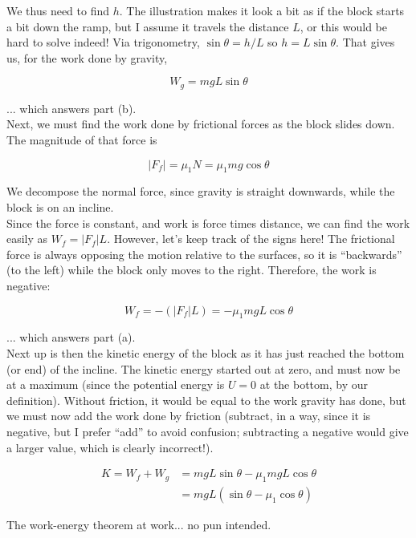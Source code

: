 \documentclass[12pt,a4paper]{report}
\begin{document}
We thus need to find $h$. The illustration makes it look a bit as if the block starts a bit down the ramp, but I assume it travels the distance $L$, or this would be hard to solve indeed! Via trigonometry, $\sin \theta = h/L$ so $h = L \sin \theta$. That gives us, for the work done by gravity,

\begin{equation}
W_g = m g L \sin \theta
\end{equation}

... which answers part (b).\\
Next, we must find the work done by frictional forces as the block slides down. The magnitude of that force is

\begin{equation}
|F_f| = \mu_1 N = \mu_1 m g \cos \theta
\end{equation}

We decompose the normal force, since gravity is straight downwards, while the block is on an incline.\\
Since the force is constant, and work is force times distance, we can find the work easily as $W_f = |F_f| L$. However, let's keep track of the signs here! The frictional force is always opposing the motion relative to the surfaces, so it is ``backwards'' (to the left) while the block only moves to the right. Therefore, the work is negative:

\begin{equation}
W_f = -(|F_f| L) = - \mu_1 m g L \cos \theta
\end{equation}

... which answers part (a).\\
Next up is then the kinetic energy of the block as it has just reached the bottom (or end) of the incline. The kinetic energy started out at zero, and must now be at a maximum (since the potential energy is $U = 0$ at the bottom, by our definition). Without friction, it would be equal to the work gravity has done, but we must now add the work done by friction (subtract, in a way, since it is negative, but I prefer ``add'' to avoid confusion; subtracting a negative would give a larger value, which is clearly incorrect!).

\begin{align}
K = W_f + W_g &= m g L \sin \theta - \mu_1 m g L \cos \theta\\
              &= m g L (\sin \theta - \mu_1 \cos \theta)
\end{align}

The work-energy theorem at work... no pun intended.
\end{document}
